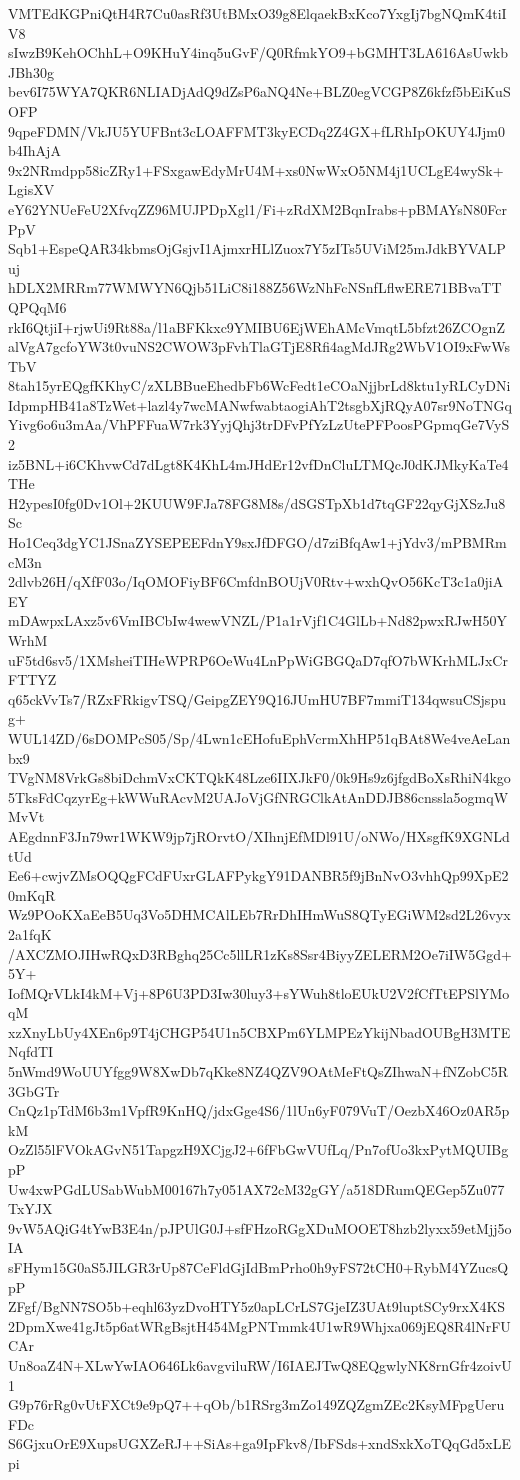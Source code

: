 VMTEdKGPniQtH4R7Cu0asRf3UtBMxO39g8ElqaekBxKco7YxgIj7bgNQmK4tiIV8
sIwzB9KehOChhL+O9KHuY4inq5uGvF/Q0RfmkYO9+bGMHT3LA616AsUwkbJBh30g
bev6I75WYA7QKR6NLIADjAdQ9dZsP6aNQ4Ne+BLZ0egVCGP8Z6kfzf5bEiKuSOFP
9qpeFDMN/VkJU5YUFBnt3cLOAFFMT3kyECDq2Z4GX+fLRhIpOKUY4Jjm0b4IhAjA
9x2NRmdpp58icZRy1+FSxgawEdyMrU4M+xs0NwWxO5NM4j1UCLgE4wySk+LgisXV
eY62YNUeFeU2XfvqZZ96MUJPDpXgl1/Fi+zRdXM2BqnIrabs+pBMAYsN80FcrPpV
Sqb1+EspeQAR34kbmsOjGsjvI1AjmxrHLlZuox7Y5zITs5UViM25mJdkBYVALPuj
hDLX2MRRm77WMWYN6Qjb51LiC8i188Z56WzNhFcNSnfLflwERE71BBvaTTQPQqM6
rkI6QtjiI+rjwUi9Rt88a/l1aBFKkxc9YMIBU6EjWEhAMcVmqtL5bfzt26ZCOgnZ
alVgA7gcfoYW3t0vuNS2CWOW3pFvhTlaGTjE8Rfi4agMdJRg2WbV1OI9xFwWsTbV
8tah15yrEQgfKKhyC/zXLBBueEhedbFb6WcFedt1eCOaNjjbrLd8ktu1yRLCyDNi
IdpmpHB41a8TzWet+lazl4y7wcMANwfwabtaogiAhT2tsgbXjRQyA07sr9NoTNGq
Yivg6o6u3mAa/VhPFFuaW7rk3YyjQhj3trDFvPfYzLzUtePFPoosPGpmqGe7VyS2
iz5BNL+i6CKhvwCd7dLgt8K4KhL4mJHdEr12vfDnCluLTMQcJ0dKJMkyKaTe4THe
H2ypesI0fg0Dv1Ol+2KUUW9FJa78FG8M8s/dSGSTpXb1d7tqGF22qyGjXSzJu8Sc
Ho1Ceq3dgYC1JSnaZYSEPEEFdnY9sxJfDFGO/d7ziBfqAw1+jYdv3/mPBMRmcM3n
2dlvb26H/qXfF03o/IqOMOFiyBF6CmfdnBOUjV0Rtv+wxhQvO56KcT3c1a0jiAEY
mDAwpxLAxz5v6VmIBCbIw4wewVNZL/P1a1rVjf1C4GlLb+Nd82pwxRJwH50YWrhM
uF5td6sv5/1XMsheiTIHeWPRP6OeWu4LnPpWiGBGQaD7qfO7bWKrhMLJxCrFTTYZ
q65ckVvTs7/RZxFRkigvTSQ/GeipgZEY9Q16JUmHU7BF7mmiT134qwsuCSjspug+
WUL14ZD/6sDOMPcS05/Sp/4Lwn1cEHofuEphVcrmXhHP51qBAt8We4veAeLanbx9
TVgNM8VrkGs8biDchmVxCKTQkK48Lze6IIXJkF0/0k9Hs9z6jfgdBoXsRhiN4kgo
5TksFdCqzyrEg+kWWuRAcvM2UAJoVjGfNRGClkAtAnDDJB86cnssla5ogmqWMvVt
AEgdnnF3Jn79wr1WKW9jp7jROrvtO/XIhnjEfMDl91U/oNWo/HXsgfK9XGNLdtUd
Ee6+cwjvZMsOQQgFCdFUxrGLAFPykgY91DANBR5f9jBnNvO3vhhQp99XpE20mKqR
Wz9POoKXaEeB5Uq3Vo5DHMCAlLEb7RrDhIHmWuS8QTyEGiWM2sd2L26vyx2a1fqK
/AXCZMOJIHwRQxD3RBghq25Cc5llLR1zKs8Ssr4BiyyZELERM2Oe7iIW5Ggd+5Y+
IofMQrVLkI4kM+Vj+8P6U3PD3Iw30luy3+sYWuh8tloEUkU2V2fCfTtEPSlYMoqM
xzXnyLbUy4XEn6p9T4jCHGP54U1n5CBXPm6YLMPEzYkijNbadOUBgH3MTENqfdTI
5nWmd9WoUUYfgg9W8XwDb7qKke8NZ4QZV9OAtMeFtQsZIhwaN+fNZobC5R3GbGTr
CnQz1pTdM6b3m1VpfR9KnHQ/jdxGge4S6/1lUn6yF079VuT/OezbX46Oz0AR5pkM
OzZl55lFVOkAGvN51TapgzH9XCjgJ2+6fFbGwVUfLq/Pn7ofUo3kxPytMQUIBgpP
Uw4xwPGdLUSabWubM00167h7y051AX72cM32gGY/a518DRumQEGep5Zu077TxYJX
9vW5AQiG4tYwB3E4n/pJPUlG0J+sfFHzoRGgXDuMOOET8hzb2lyxx59etMjj5oIA
sFHym15G0aS5JILGR3rUp87CeFldGjIdBmPrho0h9yFS72tCH0+RybM4YZucsQpP
ZFgf/BgNN7SO5b+eqhl63yzDvoHTY5z0apLCrLS7GjeIZ3UAt9luptSCy9rxX4KS
2DpmXwe41gJt5p6atWRgBsjtH454MgPNTmmk4U1wR9Whjxa069jEQ8R4lNrFUCAr
Un8oaZ4N+XLwYwIAO646Lk6avgviluRW/I6IAEJTwQ8EQgwlyNK8rnGfr4zoivU1
G9p76rRg0vUtFXCt9e9pQ7++qOb/b1RSrg3mZo149ZQZgmZEc2KsyMFpgUeruFDc
S6GjxuOrE9XupsUGXZeRJ++SiAs+ga9IpFkv8/IbFSds+xndSxkXoTQqGd5xLEpi
